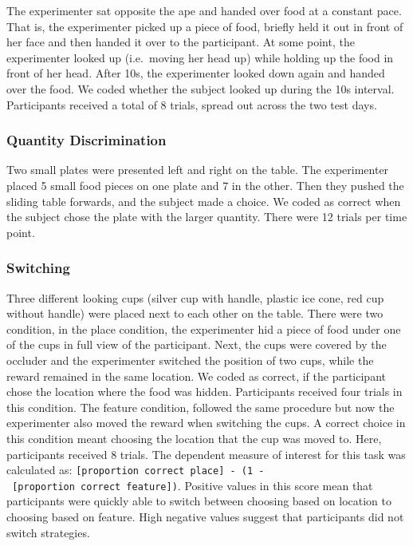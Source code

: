 \documentclass[10pt, letterpaper]{article}
\begin{document}
The experimenter sat opposite the ape and handed over food at a constant
pace. That is, the experimenter picked up a piece of food, briefly held
it out in front of her face and then handed it over to the participant.
At some point, the experimenter looked up (i.e.~moving her head up)
while holding up the food in front of her head. After 10s, the
experimenter looked down again and handed over the food. We coded
whether the subject looked up during the 10s interval. Participants
received a total of 8 trials, spread out across the two test days.

\hypertarget{quantity-discrimination}{%
\subsubsection{Quantity Discrimination}\label{quantity-discrimination}}

Two small plates were presented left and right on the table. The
experimenter placed 5 small food pieces on one plate and 7 in the other.
Then they pushed the sliding table forwards, and the subject made a
choice. We coded as correct when the subject chose the plate with the
larger quantity. There were 12 trials per time point.

\hypertarget{switching}{%
\subsubsection{Switching}\label{switching}}

Three different looking cups (silver cup with handle, plastic ice cone,
red cup without handle) were placed next to each other on the table.
There were two condition, in the place condition, the experimenter hid a
piece of food under one of the cups in full view of the participant.
Next, the cups were covered by the occluder and the experimenter
switched the position of two cups, while the reward remained in the same
location. We coded as correct, if the participant chose the location
where the food was hidden. Participants received four trials in this
condition. The feature condition, followed the same procedure but now
the experimenter also moved the reward when switching the cups. A
correct choice in this condition meant choosing the location that the
cup was moved to. Here, participants received 8 trials. The dependent
measure of interest for this task was calculated as:
\texttt{{[}proportion\ correct\ place{]}\ -\ (1\ -\ {[}proportion\ correct\ feature{]})}.
Positive values in this score mean that participants were quickly able
to switch between choosing based on location to choosing based on
feature. High negative values suggest that participants did not switch
strategies.
\end{document}
